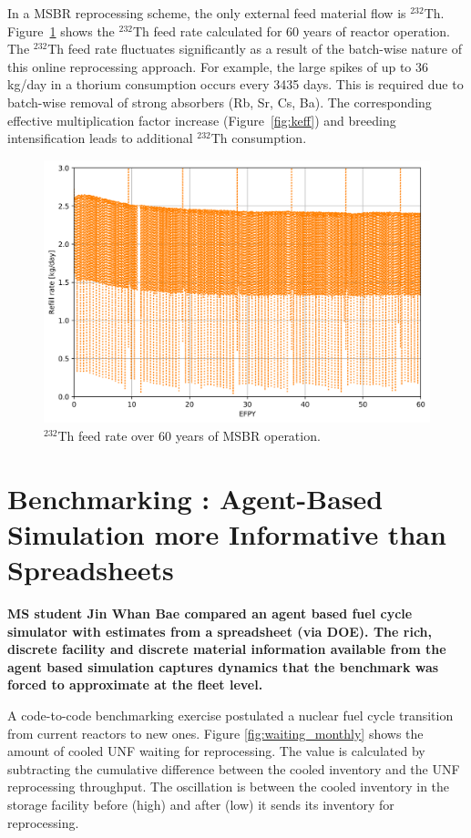 \documentclass{article}
\begin{document}
In a \gls{MSBR} reprocessing scheme, the only external feed material flow  is
$^{232}$Th. Figure~\ref{fig:th_refill} shows the $^{232}$Th feed rate
calculated for 60 years of reactor operation. The $^{232}$Th feed rate
fluctuates significantly as a result of the batch-wise nature of this online
reprocessing approach. For example, the large spikes of up to 36 kg/day in a
thorium consumption occurs every 3435 days. This is required due to batch-wise
removal of strong absorbers (Rb, Sr, Cs, Ba). The corresponding effective
multiplication factor increase (Figure~\ref{fig:keff}) and breeding
intensification leads to additional $^{232}$Th consumption.

\begin{figure}[ht!] %
  \includegraphics[width=\textwidth]{Th_refill_rate.png} \caption{$^{232}$Th
  feed rate over 60 years of \gls{MSBR} operation.}
  \label{fig:th_refill}
\end{figure}

\FloatBarrier
\section*{Benchmarking : Agent-Based Simulation more Informative than Spreadsheets \cite{bae_standardized_2018}}
\textbf{MS student Jin Whan Bae compared an agent based fuel cycle simulator 
        with estimates from a spreadsheet (via DOE). The rich, discrete 
        facility and discrete material information available from the agent 
based simulation captures dynamics that the benchmark was forced to approximate 
at the fleet level.}

A code-to-code benchmarking exercise postulated a nuclear fuel cycle transition 
from current reactors to new ones. 
Figure \ref{fig:waiting_monthly} shows the amount of cooled \gls{UNF} waiting 
for
reprocessing. The value is calculated by subtracting the cumulative difference 
between
the cooled inventory and the \gls{UNF} reprocessing throughput.
The oscillation is between the cooled inventory in the storage facility before 
(high)
and after (low) it sends its inventory for reprocessing.
\end{document}
